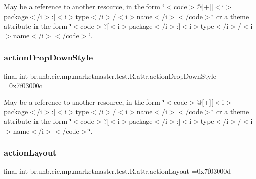 May be a reference to another resource, in the form \char`\"{}$<$code$>$@\mbox{[}+\mbox{]}\mbox{[}$<$i$>$package$<$/i$>$\+:\mbox{]}$<$i$>$type$<$/i$>$/$<$i$>$name$<$/i$>$$<$/code$>$\char`\"{} or a theme attribute in the form \char`\"{}$<$code$>$?\mbox{[}$<$i$>$package$<$/i$>$\+:\mbox{]}$<$i$>$type$<$/i$>$/$<$i$>$name$<$/i$>$$<$/code$>$\char`\"{}. \mbox{\label{classbr_1_1unb_1_1cic_1_1mp_1_1marketmaster_1_1test_1_1R_1_1attr_a2c25d3c8533babaf491919f1c29cb71b}} 
\subsubsection{\texorpdfstring{action\+Drop\+Down\+Style}{actionDropDownStyle}}
{\footnotesize\ttfamily final int br.\+unb.\+cic.\+mp.\+marketmaster.\+test.\+R.\+attr.\+action\+Drop\+Down\+Style =0x7f03000c\hspace{0.3cm}{\ttfamily [static]}}

May be a reference to another resource, in the form \char`\"{}$<$code$>$@\mbox{[}+\mbox{]}\mbox{[}$<$i$>$package$<$/i$>$\+:\mbox{]}$<$i$>$type$<$/i$>$/$<$i$>$name$<$/i$>$$<$/code$>$\char`\"{} or a theme attribute in the form \char`\"{}$<$code$>$?\mbox{[}$<$i$>$package$<$/i$>$\+:\mbox{]}$<$i$>$type$<$/i$>$/$<$i$>$name$<$/i$>$$<$/code$>$\char`\"{}. \mbox{\label{classbr_1_1unb_1_1cic_1_1mp_1_1marketmaster_1_1test_1_1R_1_1attr_aa77e503bf357a7ebabe4c0558fd7e1dc}} 
\subsubsection{\texorpdfstring{action\+Layout}{actionLayout}}
{\footnotesize\ttfamily final int br.\+unb.\+cic.\+mp.\+marketmaster.\+test.\+R.\+attr.\+action\+Layout =0x7f03000d\hspace{0.3cm}{\ttfamily [static]}}

